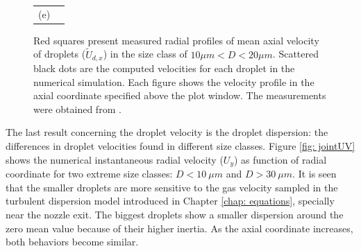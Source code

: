 \begin{figure}[!htb]
\begin{tabular}{cc}
(e) & \\
\end{tabular}
 \caption{Red squares present measured radial profiles of mean axial velocity of droplets ($\tilde{U}_{d,x}$) in the size class of $10\mu m <D<20\mu m$. Scattered black dots are the computed velocities for each droplet in the numerical simulation. Each figure shows the velocity profile in the axial coordinate specified above the plot window. The measurements were obtained from \cite{chen}.}
 \label{fig: Ux}
\end{figure}

The last result concerning the droplet velocity is the droplet dispersion: the differences in droplet velocities found in different size classes. Figure \ref{fig: jointUV} shows the numerical instantaneous radial velocity ($U_{y}$) as function of radial coordinate for two extreme size classes: $D< 10\ \mu m$ and $D> 30\ \mu m$. It is seen that the smaller droplets are more sensitive to the gas velocity sampled in the turbulent dispersion model introduced in Chapter \ref{chap: equations}, specially near the nozzle exit. The biggest droplets show a smaller dispersion around the zero mean value because of their higher inertia. As the axial coordinate increases, both behaviors become similar.

